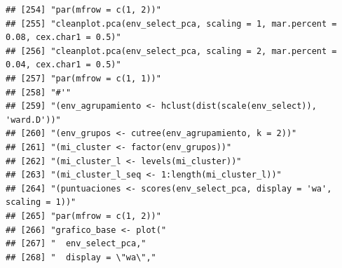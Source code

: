 \documentclass[11pt,]{article}
\begin{document}
\begin{verbatim}
## [254] "par(mfrow = c(1, 2))"                                                                                                                                                  
## [255] "cleanplot.pca(env_select_pca, scaling = 1, mar.percent = 0.08, cex.char1 = 0.5)"                                                                                       
## [256] "cleanplot.pca(env_select_pca, scaling = 2, mar.percent = 0.04, cex.char1 = 0.5)"                                                                                       
## [257] "par(mfrow = c(1, 1))"                                                                                                                                                  
## [258] "#'"                                                                                                                                                                    
## [259] "(env_agrupamiento <- hclust(dist(scale(env_select)), 'ward.D'))"                                                                                                       
## [260] "(env_grupos <- cutree(env_agrupamiento, k = 2))"                                                                                                                       
## [261] "(mi_cluster <- factor(env_grupos))"                                                                                                                                    
## [262] "(mi_cluster_l <- levels(mi_cluster))"                                                                                                                                  
## [263] "(mi_cluster_l_seq <- 1:length(mi_cluster_l))"                                                                                                                          
## [264] "(puntuaciones <- scores(env_select_pca, display = 'wa', scaling = 1))"                                                                                                 
## [265] "par(mfrow = c(1, 2))"                                                                                                                                                  
## [266] "grafico_base <- plot("                                                                                                                                                 
## [267] "  env_select_pca,"                                                                                                                                                     
## [268] "  display = \"wa\","                                                                                                                                                   

\end{verbatim}
\end{document}
